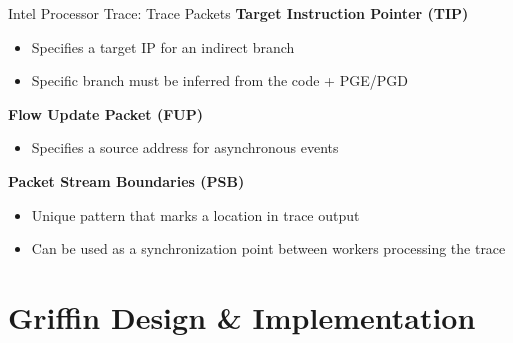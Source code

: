 \documentclass[12pt, dvipsnames, aspectratio=169]{beamer}
\begin{document}
\begin{frame}[c]{Intel Processor Trace: Trace Packets}{}
{\bf Target Instruction Pointer (TIP)}
\begin{itemize}
  \item Specifies a target IP for an indirect branch
  \item Specific branch must be inferred from the code + PGE/PGD
\end{itemize}

\vfill
{\bf Flow Update Packet (FUP)}
\begin{itemize}
  \item Specifies a source address for asynchronous events
\end{itemize}

\vfill
{\bf Packet Stream Boundaries (PSB)}
\begin{itemize}
  \item Unique pattern that marks a location in trace output
  \item Can be used as a synchronization point between workers processing the trace
\end{itemize}
\end{frame}

\section{Griffin Design \& Implementation}
\end{document}
